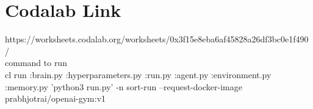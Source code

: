 \section{Codalab Link}
\label{sec:conclusion}

https://worksheets.codalab.org/worksheets/0x3f15e8eba6af45828a26df3bc0e1f490/  \\
command to run \\

cl run :brain.py :hyperparameters.py :run.py :agent.py :environment.py :memory.py 'python3 run.py' -n sort-run --request-docker-image prabhjotrai/openai-gym:v1 \\
